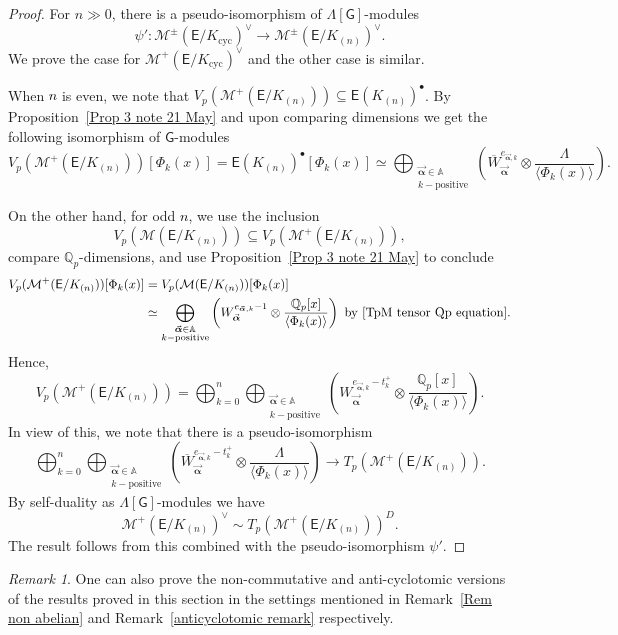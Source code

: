 \documentclass{amsart}
\newcommand{\edit}[1]{\textcolor{black}{#1}}
\numberwithin{equation}{section}
\theoremstyle{remark}
\newtheorem{remark}[theorem]{Remark}
\newcommand{\val}{\vec{\boldsymbol{\alpha}}}
\newcommand{\EC}{\mathsf{E}}
\newcommand{\cM}{\mathcal{M}}
\newcommand{\Qp}{\mathbb{Q}_p}
\newcommand{\sG}{\mathsf{G}}
\newcommand{\A}{\mathbb{A}}
\newcommand{\cyc}{\operatorname{{cyc}}}
\theoremstyle{plain} %
\begin{document}
\begin{proof}
For $n \gg 0$, there is a pseudo-isomorphism of $\Lambda[\sG]$-modules 
\[
\psi' : \cM^{\pm}(\EC/K_{\cyc})^\vee \longrightarrow \cM^{\pm}(\EC/K_{(n)})^\vee.
\]
We prove the case for $\cM^{+}(\EC/K_{\cyc})^\vee$ and the other case is similar.

When \edit{$n$} is even, we note that $V_p(\cM^+(\EC/K_{(n)})) \subseteq \EC(K_{(n)})^{\bullet}$.
By Proposition~\ref{Prop 3 note 21 May} and upon comparing dimensions we get the following isomorphism of $\sG$-module\edit{s}
\[
V_p(\cM^+(\EC/K_{(n)}))[\Phi_k(x)] = \EC(K_{(n)})^{\bullet}[\Phi_k(x)] \simeq \bigoplus_{\substack{\val\in \A \\ k-\text{positive}}}\left( \overline{W}_{\val}^{e_{\val,k}} \otimes \frac{\Lambda}{\langle \Phi_k(x)\rangle}\right).
\]

On the other hand, for odd \edit{$n$}, we use the inclusion
\[
V_p(\cM(\EC/K_{(n)})) \subseteq V_p(\cM^+(\EC/K_{(n)})),
\]
compare $\Qp$-dimensions, and use Proposition~\ref{Prop 3 note 21 May} to conclude
\begin{align*}
V_p(\cM^+(\EC/K_{(n)}))[\Phi_k(x)] &= V_p(\cM(\EC/K_{(n)}))[\Phi_k(x)] \\
& \simeq \bigoplus_{\substack{\val\in \A\\ k-\text{positive}}} \left( W_{\val}^{e_{\val,k}-1} \otimes \frac{\Qp[x]}{\langle \Phi_k(x)\rangle} \right) \text{ by \eqref{TpM tensor Qp equation}}.
\end{align*}
Hence,
\[
V_p(\cM^+(\EC/K_{(n)})) = \bigoplus_{k=0}^n \bigoplus_{\substack{\val\in \A\\ k-\text{positive}}} \left( W_{\val}^{e_{\val,k}-t_k^+} \otimes \frac{\Qp[x]}{\langle \Phi_k(x)\rangle} \right).
\]
In view of this, we note that there is a pseudo-isomorphism \[
\bigoplus_{k=0}^n \bigoplus_{\substack{\val\in \A\\ k-\text{positive}}} \left( \overline{W}_{\val}^{e_{\val,k}-t^{+}_k} \otimes \frac{\Lambda}{\langle \Phi_k(x)\rangle} \right) \longrightarrow T_p(\cM^+(\EC/K_{(n)})).
\]
By self-duality as $\Lambda[\sG]$-modules we have
\[
\cM^+(\EC/K_{(n)})^\vee \sim T_p(\cM^+(\EC/K_{(n)}))^D.
\]
The result follows from this combined with the pseudo-isomorphism $\psi'$.
\end{proof}

\begin{remark}
\label{Rem on pm noncommutative and anticyclotomic}
One can also prove the non-commutative and anti-cyclotomic versions of the results proved in this section in the settings mentioned in Remark~\ref{Rem non abelian} and Remark~\ref{anticyclotomic remark} respectively.
\end{remark}
\end{document}
